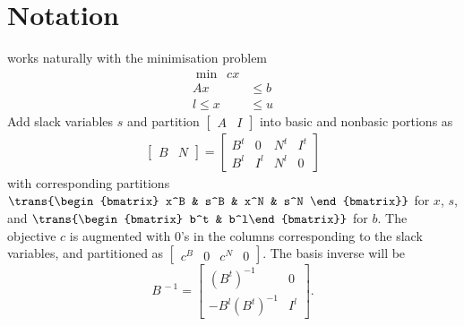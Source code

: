 
\section{Notation}
\label{sec:Notation}

\dylp works naturally with the minimisation problem
\begin{equation}
\begin{split}
\min \enspace  cx & \\
      Ax & \leq b \\
l \leq x & \leq u
\end{split} \label{Eqn:BoundedPrimal}
\end{equation}
Add slack variables $s$ and partition $\begin{bmatrix} A & I \end{bmatrix}$
into basic and nonbasic portions as
\begin{equation*}
\begin{split}
\begin{bmatrix} B & N \end{bmatrix} =
\left[
\begin{array}{cc|cc}
B^t & 0 & N^t & I^t \\
B^l & I^l & N^l & 0
\end{array}
\right]
\end{split}
\end{equation*}
with corresponding partitions
\begin{math}
\trans{\begin{bmatrix} x^B & s^B & x^N & s^N \end{bmatrix}}
\end{math}
for $x$, $s$, and
\begin{math}
\trans{\begin{bmatrix} b^t & b^l\end{bmatrix}}
\end{math}
for $b$.
The objective $c$ is augmented with 0's in the columns corresponding to the
slack variables, and partitioned as
\begin{math}
\begin{bmatrix} c^B & 0 & c^N & 0 \end{bmatrix}
\end{math}.
The basis inverse will be 
\begin{equation*}
B^{\,-1} = \begin{bmatrix}
	     (B^t)^{-1} & 0 \\
	     -B^l(B^t)^{-1} & I^l
	    \end{bmatrix}.
\end{equation*}
